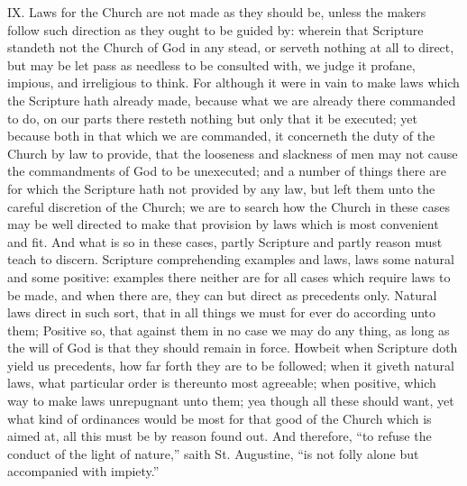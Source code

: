 IX. Laws for the Church are not made as they should be, unless the makers follow such direction as they ought to be guided by: wherein that Scripture standeth not the Church of God in any stead, or serveth nothing at all to direct, but may be let pass as needless to be consulted with, we judge it profane, impious, and irreligious to think. For although it were in vain to make laws which the Scripture hath already made, because what we are already there commanded to do, on our parts there resteth nothing but only that it be executed; yet because both in that which we are commanded, it concerneth the duty of the Church by law to provide, that the looseness and slackness of men may not cause the commandments of God to be unexecuted; and a number of things there are for which the Scripture hath not provided by any law,  but left them unto the careful discretion of the Church; we are to search how the Church in these cases may be well directed to make that provision by laws which is most convenient and fit. And what is so in these cases, partly Scripture and partly reason must teach to discern. Scripture comprehending examples and laws, laws some natural and some positive: examples there neither are for all cases which require laws to be made, and when there are, they can but direct as precedents only. Natural laws direct in such sort, that in all things we must for ever do according unto them; Positive so, that against them in no case we may do any thing, as long as the will of God is that they should remain in force. Howbeit when Scripture doth yield us precedents, how far forth they are to be followed; when it giveth natural laws, what particular order is thereunto most agreeable; when positive, which way to make laws unrepugnant unto them; yea though all these should want, yet what kind of ordinances would be most for that good of the Church which is aimed at, all this must be by reason found out. And therefore, “to refuse the conduct of the light of nature,” saith St. Augustine, “is not folly alone but accompanied with impiety.”

